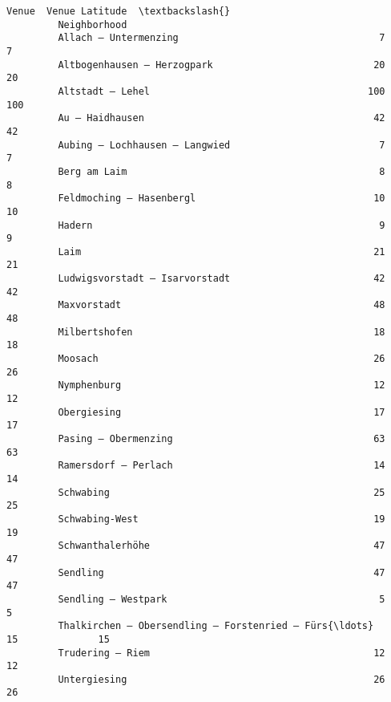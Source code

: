 \documentclass[11pt]{article}
\begin{document}
\begin{Verbatim}[commandchars=\\\{\}]
                                                             Venue  Venue Latitude  \textbackslash{}
         Neighborhood                                                                
         Allach – Untermenzing                                   7               7   
         Altbogenhausen – Herzogpark                            20              20   
         Altstadt – Lehel                                      100             100   
         Au – Haidhausen                                        42              42   
         Aubing – Lochhausen – Langwied                          7               7   
         Berg am Laim                                            8               8   
         Feldmoching – Hasenbergl                               10              10   
         Hadern                                                  9               9   
         Laim                                                   21              21   
         Ludwigsvorstadt – Isarvorstadt                         42              42   
         Maxvorstadt                                            48              48   
         Milbertshofen                                          18              18   
         Moosach                                                26              26   
         Nymphenburg                                            12              12   
         Obergiesing                                            17              17   
         Pasing – Obermenzing                                   63              63   
         Ramersdorf – Perlach                                   14              14   
         Schwabing                                              25              25   
         Schwabing-West                                         19              19   
         Schwanthalerhöhe                                       47              47   
         Sendling                                               47              47   
         Sendling – Westpark                                     5               5   
         Thalkirchen – Obersendling – Forstenried – Fürs{\ldots}     15              15   
         Trudering – Riem                                       12              12   
         Untergiesing                                           26              26   
         

\end{Verbatim}
\end{document}
